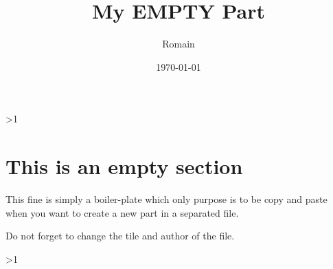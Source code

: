 \documentclass[a4paper]{article}  %
\title{My EMPTY Part}
\author{Romain \famName{Noël}}
\date{\today}
\newcommand{\Pathbasebib}{\PathR/ref_RN.bib,\PathR/ref_XX.bib}%
\begin{document}

\ifnum\value{levelstanda}>1
	{}%
\else
	\maketitle
\fi


\section{This is an empty section}
	This fine is simply a boiler-plate which only purpose is to be copy and paste when you want to create a new part in a separated file.

	Do not forget to change the tile and author of the file.


\ifnum\value{levelstanda}>1
	{}%
\else

	\printunsrtglossary[type=acronym]
	\printunsrtglossary[type=symbol]
\fi

\addtocounter{levelstanda}{-1}
\end{document}
